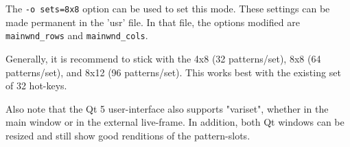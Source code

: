    The \texttt{-o sets=8x8} option can be used to set this mode.
   These settings can be made permanent in the 'usr' file.
   In that file, the options modified are \texttt{mainwnd\_rows} and
   \texttt{mainwnd\_cols}.

   Generally, it is recommend to stick with the 4x8 (32 patterns/set),
   8x8 (64 patterns/set), and 8x12 (96 patterns/set).  This works best with the
   existing set of 32 hot-keys.

   Also note that the Qt 5 user-interface also supports "variset", whether in
   the main window or in the external live-frame.  In addition, both Qt windows
   can be resized and still show good renditions of the pattern-slots.

